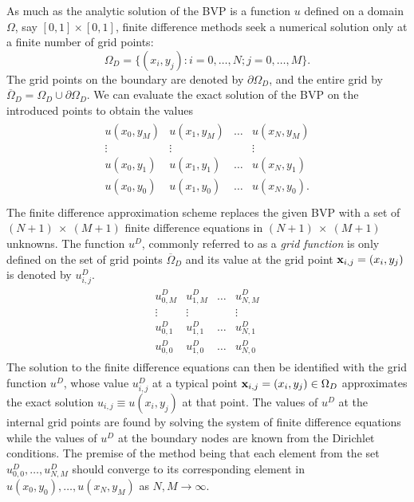 As much as the analytic solution of the BVP is a function $u$ defined on
a domain $\Omega$, say $[0,1]\times[0,1]$, finite difference methods seek a
numerical solution only at a finite number of grid points:
\[
\Omega_D = \{(x_i,y_j):i=0,\ldots,N;j=0,\ldots, M\}.
\]
The grid points on the boundary are denoted by $\partial\Omega_D$, and the
entire grid by $\overline{\Omega}_D=\Omega_D\cup\partial \Omega_D$. We can evaluate the exact solution of the BVP on the introduced points to obtain the values
\begin{align*}
\begin{array}{cccc}
u(x_0,y_M) & u(x_1,y_M) & \ldots & u(x_N,y_M)\\
  \vdots   &   \vdots   &        &   \vdots  \\
u(x_0,y_1) & u(x_1,y_1) & \ldots & u(x_N,y_1)\\
u(x_0,y_0) & u(x_1,y_0) & \ldots & u(x_N,y_0).\\
\end{array}
\end{align*}
The finite difference approximation scheme replaces the given BVP with a set
of $(N+1)~\times~(M+1)$ finite difference equations in $(N+1)~\times~(M+1)$
unknowns. The function $u^D$, commonly referred to as  a \emph{grid function}
is only defined on the set of grid points $\overline{\Omega}_D$ and its value
at the grid point $\mathbf{x}_{i,j}=(x_i,y_j)$ is denoted by $u^D_{i,j}$.
\begin{align*}
\begin{array}{cccc}
u^D_{0,M} & u^D_{1,M} & \ldots & u^D_{N,M}\\
\vdots  & \vdots  &        & \vdots \\
u^D_{0,1} & u^D_{1,1} & \ldots & u^D_{N,1}\\
u^D_{0,0} & u^D_{1,0} & \ldots & u^D_{N,0}
\end{array}
\end{align*}
The solution to the finite difference equations can then be identified with the
grid function $u^D$, whose value $u^D_{i,j}$ at a typical point $\mathbf{x}_{i,j}=(x_i,y_j)\in\Omega_D$ approximates the exact solution $u_{i,j} \equiv u(x_i,y_j)$ at that point. The values of $u^D$ at the internal grid points are found by solving the system of finite difference equations while the values of $u^D$ at the boundary nodes are known from the Dirichlet conditions. The premise of the method being that each element from the set $u^D_{0,0},\ldots, u^D_{N,M}$ should converge to its corresponding element in $u(x_0,y_0),\ldots, u(x_N,y_M)$ as $N,M\rightarrow\infty$.
